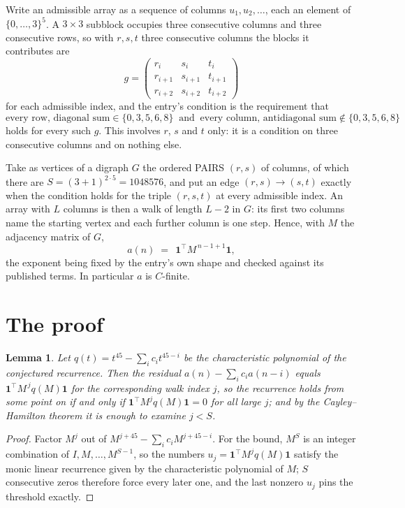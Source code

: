 \documentclass[11pt,a4paper]{article}
\theoremstyle{plain}
\newtheorem{lemma}[theorem]{Lemma}
\theoremstyle{definition}
\begin{document}
Write an admissible array as a sequence of columns $u_1,u_2,\dots$, each an element of
$\{0,\dots,3\}^{5}$. A $3\times3$ subblock occupies three consecutive columns and
three consecutive rows, so with $r,s,t$ three consecutive columns the blocks it
contributes are
\[
g=\begin{pmatrix}r_i&s_i&t_i\\ r_{i+1}&s_{i+1}&t_{i+1}\\ r_{i+2}&s_{i+2}&t_{i+2}\end{pmatrix}
\]
for each admissible index, and the entry's condition is the requirement that
\[
\text{every row, diagonal sum} \in \{0,3,5,6,8\}\ \text{ and }\ \text{every column, antidiagonal sum} \notin \{0,3,5,6,8\}
\]
holds for every such $g$. This involves $r$, $s$ and $t$ only: it is a condition on
three consecutive columns and on nothing else.

Take as vertices of a digraph $G$ the ordered PAIRS $(r,s)$ of columns, of which there are
$S=(3+1)^{2\cdot5}=1048576$, and put an edge $(r,s)\to(s,t)$ exactly when the condition
holds for the triple $(r,s,t)$ at every admissible index. An array with $L$ columns is then a
walk of length $L-2$ in $G$: its first two columns name the starting vertex and each further
column is one step. Hence, with $M$ the adjacency matrix of $G$,
\[
a(n)\;=\;\,\mathbf{1}^{\!\top}M^{\,n-1+1}\mathbf{1},
\]
the exponent being fixed by the entry's own shape and checked against its published terms.
In particular $a$ is $C$-finite.

\section{The proof}

\begin{lemma}\label{lem:crit}
Let $q(t)=t^{45}-\sum_i c_it^{45-i}$ be the characteristic polynomial of the
conjectured recurrence. Then the residual $a(n)-\sum_ic_ia(n-i)$ equals
$\mathbf{1}^{\!\top}M^{\,j}q(M)\mathbf{1}$ for the corresponding walk index
$j$, so the recurrence holds from some point on if and only if
$\mathbf{1}^{\!\top}M^{j}q(M)\mathbf{1}=0$ for all large $j$; and by the
Cayley--Hamilton theorem it is enough to examine $j<S$.
\end{lemma}

\begin{proof}
Factor $M^{j}$ out of $M^{j+45}-\sum_ic_iM^{j+45-i}$. For the bound, $M^{S}$
is an integer combination of $I,M,\dots,M^{S-1}$, so the numbers
$u_j=\mathbf{1}^{\!\top}M^{j}q(M)\mathbf{1}$ satisfy the monic linear recurrence given by
the characteristic polynomial of $M$; $S$ consecutive zeros therefore force every later one,
and the last nonzero $u_j$ pins the threshold exactly.
\end{proof}
\end{document}
